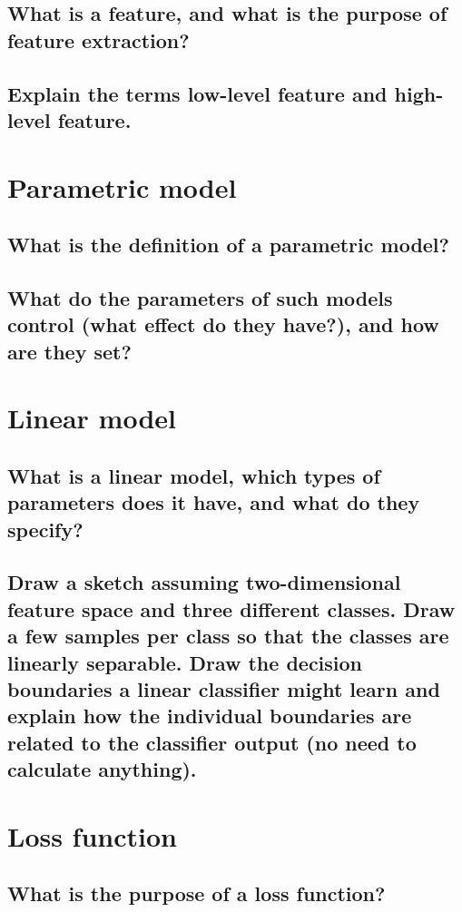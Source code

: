 \subsection{What is a feature, and what is the purpose of feature extraction?}
\subsection{Explain the terms low-level feature and high-level feature.}

\section{Parametric model}
\subsection{What is the definition of a parametric model?}
\subsection{What do the parameters of such models control (what effect do they have?), and how are they set?}

\section{Linear model}
\subsection{What is a linear model, which types of parameters does it have, and what do they specify?}
\subsection{Draw a sketch assuming two-dimensional feature space and three different classes. Draw a few samples per class so that the classes are linearly separable. Draw the decision boundaries a linear classifier might learn and explain how the individual boundaries are related to the classifier output (no need to calculate anything).}

\section{Loss function}
\subsection{What is the purpose of a loss function?}
